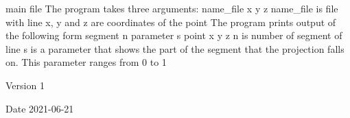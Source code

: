 main file The program takes three arguments\+: name\+\_\+file x y z name\+\_\+file is file with line x, y and z are coordinates of the point The program prints output of the following form segment n parameter s point x y z n is number of segment of line s is a parameter that shows the part of the segment that the projection falls on. This parameter ranges from 0 to 1 \begin{DoxyVersion}{Version}
1 
\end{DoxyVersion}
\begin{DoxyDate}{Date}
2021-\/06-\/21 
\end{DoxyDate}
